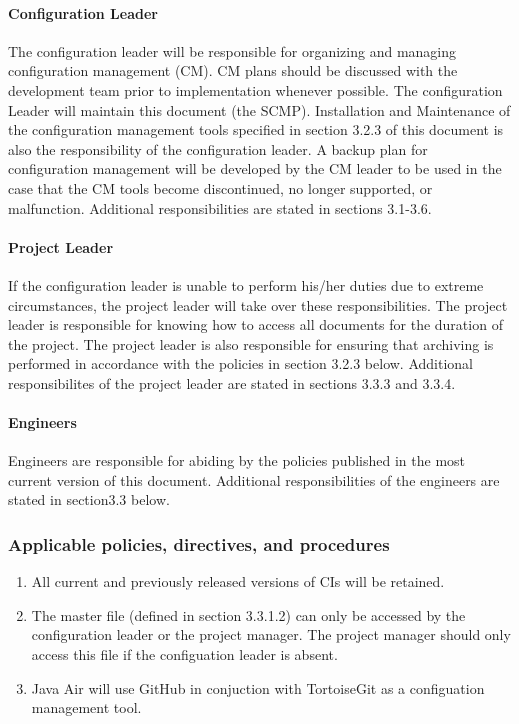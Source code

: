 \documentclass{scrartcl}
\begin{document}
\paragraph{Configuration Leader}
The configuration leader will be responsible for organizing and managing configuration management (CM).  CM plans should be discussed with the development team prior to implementation whenever possible.  The configuration Leader will maintain this document (the SCMP).  Installation and Maintenance of the configuration management tools specified in section 3.2.3 of this document is also the responsibility of the configuration leader.  A backup plan for configuration management will be developed by the CM leader to be used in the case that the CM tools become discontinued, no longer supported, or malfunction.
Additional responsibilities are stated in sections 3.1-3.6.
\paragraph{Project Leader}
If the configuration leader is unable to perform his/her duties due to extreme circumstances, the project leader will take over these responsibilities.  The project leader is responsible for knowing how to access all documents for the duration of the project.  The project leader is also responsible for ensuring that archiving is performed in accordance with the policies in section 3.2.3 below.  Additional responsibilites of the project leader are stated in sections 3.3.3 and 3.3.4.
\paragraph{Engineers}
Engineers are responsible for abiding by the policies published in the most current version of this document.  Additional responsibilities of the engineers are stated in section3.3 below.
\subsubsection{Applicable policies, directives, and procedures}
\begin{enumerate}
\item
All current and previously released versions of CIs will be retained.
\item
The master file (defined in section 3.3.1.2) can only be accessed by the configuration leader or the project manager.  The project manager should only access this file if the configuation leader is absent.
\item
Java Air will use GitHub in conjuction with TortoiseGit as a configuation management tool.
\end{enumerate}
\end{document}
